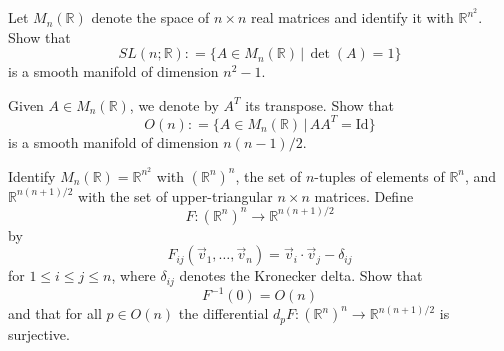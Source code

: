\documentclass{ximera}
\begin{document}
\begin{exercise}
Let $M_n (\mathbb{R})$ denote the space of $n\times n$ real matrices and identify it with $\mathbb{R}^{n^2}$.    Show that 
    \[      SL (n ; \mathbb{R} ) : = \{ A \in M_n (\mathbb{R}) \, \vert \, \det (A) = 1 \}         \]
    is a smooth manifold of dimension $n^2 -1 $. 
\end{exercise}


\begin{exercise}
    Given $A \in M_n(\mathbb{R})$, we denote by $A^T $ its transpose. Show that
    \[      O  (n ) : = \{ A \in M_n (\mathbb{R}) \, \vert \, A A^{T}  = \text{Id} \}         \]
    is a smooth manifold of dimension $n(n-1)/2$. 

    \begin{hint}
        Identify $M_n (\mathbb{R}) = \mathbb{R}^{n^2}$ with $(\mathbb{R}^n)^n$, the set of $n$-tuples of elements of $\mathbb{R}^n$, and $\mathbb{R}^{n(n+1)/2}$ with the set of upper-triangular $n \times n$ matrices.   Define 
        \[    F :    (\mathbb{R}^n)^n \to \mathbb{R}^{n(n+1)/2}      \]
        by
        \[      F _{ij}(  \Vec{v}_1, \ldots,  \Vec{v}_n ) = \Vec{v}_i \cdot \Vec{v}_j - \delta _{ij}                 \]
        for $1\leq i \leq j\leq n$, where $\delta_{ij}$ denotes the Kronecker delta. Show that 
        \[        F^{-1} (0) = O (n)                      \]
        and that for all  $  p \in O (n)    $ the differential $d_p F :  (\mathbb{R}^n)^n \to \mathbb{R}^{n(n+1)/2} $ is surjective. 
    \end{hint}
\end{exercise}
\end{document}
